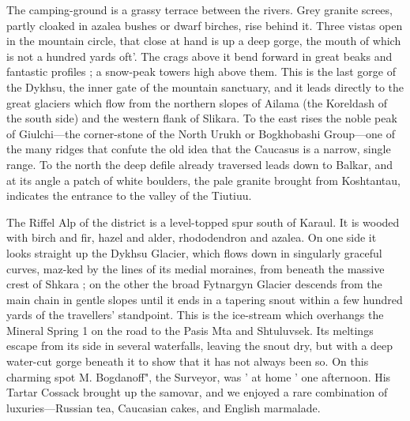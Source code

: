 \documentclass{article}
\begin{document}
	The camping-ground is a grassy terrace between the rivers. Grey granite screes, partly cloaked in azalea bushes or dwarf birches, rise behind it. Three vistas open in the mountain circle, that close at hand is up a deep gorge, the mouth of which is not a hundred yards oft'. The crags above it bend forward in great beaks and fantastic profiles ; a snow-peak towers high above them. This is the last gorge of the Dykhsu, the inner gate of the mountain sanctuary, and it leads directly to the great glaciers which flow from the northern slopes of Ailama (the Koreldash of the south side) and the western flank of Slikara. To the east rises the noble peak of Giulchi—the corner-stone of the North Urukh or Bogkhobashi Group—one of the many ridges that confute the old idea that the Caucasus is a narrow, single range. To the north the deep defile already traversed leads down to Balkar, and at its angle a patch of white boulders, the pale granite brought from Koshtantau, indicates the entrance to the valley of the Tiutiuu.
	
	The Riffel Alp of the district is a level-topped spur south of Karaul. It is wooded with birch and fir, hazel and alder, rhododendron and azalea. On one side it looks straight up the Dykhsu Glacier, which flows down in singularly graceful curves, maz-ked by the lines of its medial moraines, from beneath the massive crest of Shkara ; on the other the broad Fytnargyn Glacier descends from the main chain in gentle slopes until it ends in a tapering snout within a few hundred yards of the travellers' standpoint. This is the ice-stream which overhangs the Mineral Spring 1 on the road to the Pasis Mta and Shtuluvsek. Its meltings escape from its side in several waterfalls, leaving the snout dry, but with a deep water-cut gorge beneath it to show that it has not always been so. On this charming spot M. Bogdanoff", the Surveyor, was ' at home ' one afternoon. His Tartar Cossack brought up the samovar, and we enjoyed a rare combination of luxuries—Russian tea, Caucasian cakes, and English marmalade.
	
\end{document}
